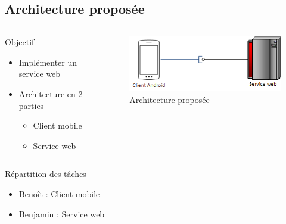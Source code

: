 \documentclass{beamer} %
\begin{document}
  \subsection{Architecture proposée}
  \begin{frame}{\subsecname}

    \begin{columns}
      \begin{column}{0.5\textwidth}
        \begin{exampleblock}{Objectif}
          \begin{itemize}
            \item Implémenter un service web
            \item Architecture en 2 parties
            \begin{itemize}
              \item Client mobile
              \item Service web
            \end{itemize}
          \end{itemize}
        \end{exampleblock}
      \end{column}
      \begin{column}{0.5\textwidth}
        \begin{figure}
        \includegraphics[width=\linewidth, height=\textheight, keepaspectratio]{archi_finale.png}
        \caption{Architecture proposée}
        \end{figure}
      \end{column}
    \end{columns}

    \pause

    \begin{block}{Répartition des tâches}
      \begin{itemize}
        \item Benoît : Client mobile
        \item Benjamin : Service web
      \end{itemize}
    \end{block}
  \end{frame}
\end{document}
